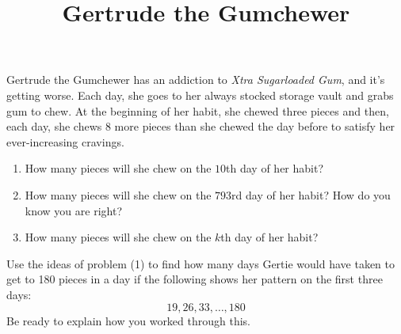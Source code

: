 \documentclass{ximera}
\title{Gertrude the Gumchewer }
\begin{document}
\begin{abstract}
    
\end{abstract}
\maketitle


\begin{problem}
Gertrude the Gumchewer has an addiction to \textit{Xtra Sugarloaded
  Gum}, and it's getting worse.  Each day, she goes to her always
stocked storage vault and grabs gum to chew.  At the beginning of her
habit, she chewed three pieces and then, each day, she chews 8 more
pieces than she chewed the day before to satisfy her ever-increasing
cravings.
\begin{enumerate}
\item How many pieces will she chew on the $10$th day of her habit?
\item How many pieces will she chew on the $793$rd day of her habit? How do you know you are right?
\item How many pieces will she chew on the $k$th day of her habit?
\end{enumerate}
\end{problem}



\vskip 2in


\begin{problem}
Use the ideas of problem (1) to find how many days Gertie would have taken to get to 180 pieces in a day if the following shows her pattern on the first three days:
\[
19, 26, 33, \dots , 180
\]
Be ready to explain how you worked through this.  
\end{problem}


\pagebreak
\end{document}

